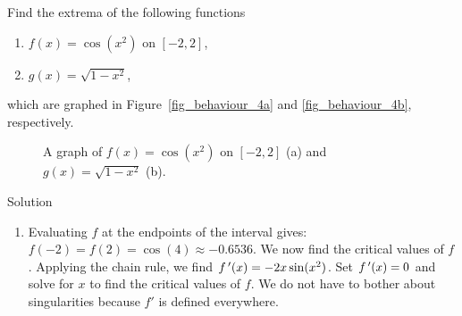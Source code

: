 \begin{example}\label{ex_extval6}
Find the extrema of the following functions
\begin{multicols}{2}
\begin{enumerate}
\item  $f(x) = \cos (x^2)$ on $[-2,2]$,
\item $g(x) = \sqrt{1-x^2}$,
\end{enumerate}
\end{multicols}
which are graphed in Figure~\ref{fig_behaviour_4a} and \ref{fig_behaviour_4b}, respectively.

\begin{figure}[H]
\centering
\qquad
{}
\caption{A graph of $f(x) = \cos (x^2)$ on $[-2,2]$ (a) and $g(x) = \sqrt{1-x^2}$ (b). }
\end{figure}

Solution 

\begin{enumerate}
\item Evaluating $f$ at the endpoints of the interval gives: $f(-2) = f(2) = \cos (4) \approx -0.6536.$ We now find the critical values of $f$. Applying the chain rule, we find $f\,'(x) = -2x\sin (x^2)$. Set $f\,'(x) = 0$ and solve for $x$ to find the critical values of $f$. We do not have to bother about singularities because $f'$ is defined everywhere. 


\end{enumerate}
\end{example}
